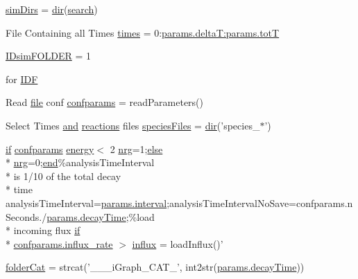 \begin{DoxyCompactItemize}
\hyperlink{a00022_aae5035eb84b89176ed5b06e136325eff}{sim\-Dirs} = \hyperlink{a00065_a4ca269cf93df1b512b52174c1a256fe5}{dir}(\hyperlink{a00022_ab3186e0326a3b47b2cfcb5577ab5139f}{search})
\item 
File Containing all Times \hyperlink{a00022_a47868b053902b822eab5c738a67a633a}{times} = 0\-:\hyperlink{a00030_aa9758857dd92f7845934f06daa7c4120}{params.\-delta\-T\-:params.\-tot\-T}
\item 
\hyperlink{a00022_aeef3e34bd64eec758eac16f004cdcef0}{I\-Dsim\-F\-O\-L\-D\-E\-R} = 1
\item 
for \hyperlink{a00022_a8acdc1bee73718b1ffcfc7eb26968f48}{I\-D\-F}
\item 
Read \hyperlink{a00062_a4e8353d6c62cf54bf4a1a8f63e56b8c3}{file} conf \hyperlink{a00022_a000cb2f4b2f69aebbfb0e8e0809567f6}{confparams} = read\-Parameters()
\item 
Select Times \hyperlink{a00022_a170f8acb213f91bf71c77b1d20bceb33}{and} \hyperlink{a00015}{reactions} files \hyperlink{a00022_af5703745c2c2a6af7f62da460994d9c2}{species\-Files} = \hyperlink{a00065_a4ca269cf93df1b512b52174c1a256fe5}{dir}('species\-\_$\ast$')
\item 
\hyperlink{a00024_a01d55766b8058903dd360b4bda71f9f5}{if} \hyperlink{a00027_a53a794fb4119b36e89d14a405e075596}{confparams} \hyperlink{a00065_ac002779c383d2cc783e881f94449de66}{energy}$<$ 2 \hyperlink{a00022_af837f695e5b67c86016c1a82608c38b4}{nrg}=1;\hyperlink{a00025_af5946383720aa572eb93e1e63afc23c2}{else} \\*
\hyperlink{a00022_af837f695e5b67c86016c1a82608c38b4}{nrg}=0;\hyperlink{a00019_afb358f48b1646c750fb9da6c6585be2b}{end}\%analysis\-Time\-Interval \\*
is 1/10 of the total decay \\*
time analysis\-Time\-Interval=\hyperlink{a00022_a4d8f56ee83b9b4dbe17b218746a1768c}{params.\-interval};analysis\-Time\-Interval\-No\-Save=confparams.\-n\-Seconds./\hyperlink{a00030_afb6aa83fb78c663f3b39be2380842a8b}{params.\-decay\-Time};\%load \\*
incoming flux \hyperlink{a00024_a01d55766b8058903dd360b4bda71f9f5}{if} \\*
\hyperlink{a00065_ad795c71664f3161dc8f7a769341daadf}{confparams.\-influx\-\_\-rate} $>$ \hyperlink{a00022_a637d2af7e7b03600bcaf1931b999e3fc}{influx} = load\-Influx()'
\item 
\hyperlink{a00022_ac4793cb55101110d228ded89ce9caa48}{folder\-Cat} = strcat('\-\_\-\-\_\-\_\-i\-Graph\-\_\-\-C\-A\-T\-\_\-', int2str(\hyperlink{a00030_afb6aa83fb78c663f3b39be2380842a8b}{params.\-decay\-Time}))

\end{DoxyCompactItemize}
